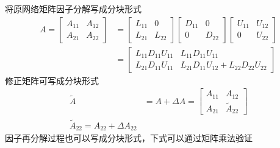 \documentclass[a4paper,12pt]{article}
\begin{document}
    将原网络矩阵因子分解写成分块形式
    \begin{equation}
      \begin{aligned}
        A=\begin{bmatrix}
          A_{11}&A_{12}\\A_{21}&A_{22}
      \end{bmatrix}&=\begin{bmatrix}
        L_{11}&0\\L_{21}&L_{22}
      \end{bmatrix} \begin{bmatrix}
        D_{11}&0\\0&D_{22}
      \end{bmatrix} \begin{bmatrix}
        U_{11}&U_{12}\\0&U_{22}
      \end{bmatrix} \\
      &=\begin{bmatrix}
        L_{11}D_{11}U_{11} & L_{11}D_{11}U_{11}\\
        L_{21}D_{11}U_{11} & L_{21}D_{11}U_{12} + L_{22}D_{22}U_{22}
    \end{bmatrix}
      \end{aligned}
    \end{equation}
    修正矩阵可写成分块形式
    \begin{equation}
      \begin{aligned}
        \widetilde A&=A+\Delta A=\begin{bmatrix}
        A_{11} & A_{12}\\ A_{21} & \widetilde A_{22}
      \end{bmatrix} \\
      \widetilde A_{22} = A_{22} + \Delta A_{22}
      \end{aligned}
    \end{equation}
    因子再分解过程也可以写成分块形式，下式可以通过矩阵乘法验证
\end{document}
